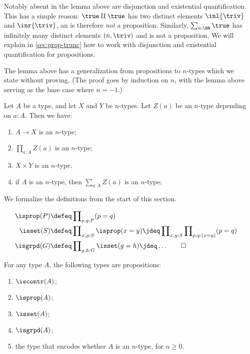 Notably absent in the lemma above are disjunction
and existential quantification. This has a simple reason:
$\true\amalg \true$ has two distinct elements
$\inl{\triv}$ and $\inr{\triv}$, an is therefore \emph{not} a proposition.
Similarly, $\sum_{n:\NN} \true$ has infinitely many
distinct elements $(n,\triv)$ and is not a proposition. We will explain
in \cref{sec:prop-trunc} how to work with disjunction and
existential quantification for propositions.

The lemma above has a generalization from propositions to
$n$-types which we state without proving.
(The proof goes by induction on $n$, with the lemma above serving as the base case where $n = -1$.)

\begin{lemma}\label{lem:level-n-utils}
Let $A$ be a type, and let $X$ and $Y$ be $n$-types.
Let $Z(a)$ be an $n$-type depending on $a:A$. Then we have:

\begin{enumerate}
\item\label{level-n-utils-codom} $A\to X$ is an $n$-type;
\item\label{level-n-utils-pi} $\prod_{a:A} Z(a)$ is an $n$-type;
\item\label{level-n-utils-times} $X\times Y$ is an $n$-type.
\item\label{level-n-utils-sum} if $A$ is an $n$-type, then $\sum_{a:A} Z(a)$ is an $n$-type;
\end{enumerate}
\end{lemma}

We formalize the definitions from the start of this section.
\begin{definition}\label{def:isSet}
\begin{align*}
\isprop(P) &\defeq\prod\nolimits_{p,q:P}(p=q)\\
\isset(S) &\defeq\prod\nolimits_{x,y:S}\isprop(x=y)\jdeq
                  \prod\nolimits_{x,y:S}\prod\nolimits_{p,q:(x=y)}(p=q)\\
\isgrpd(G) &\defeq\prod\nolimits_{g,h:G}\isset(g=h)\jdeq \ldots\qedhere
\end{align*}
\end{definition}
\begin{lemma}\label{lem:isX-is-prop}
  For any type $A$, the following types are propositions:
  \begin{enumerate}
    \item $\iscontr(A)$;
    \item $\isprop(A)$;
    \item $\isset(A)$;
    \item $\isgrpd(A)$;
    \item the type that encodes whether $A$ is an $n$-type, for $n \ge 0$.
  \end{enumerate}
\end{lemma}


